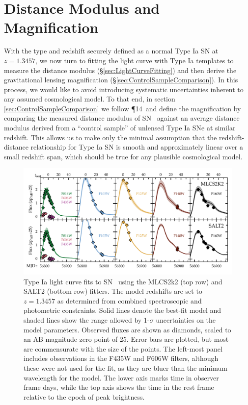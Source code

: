 \section{Distance Modulus and Magnification}
\label{sec:DistanceAndMagnification}

With the type and redshift securely defined as a normal Type Ia SN at
$z=1.3457$, we now turn to fitting the light curve with Type Ia
templates to measure the distance
modulus (\S\ref{sec:LightCurveFitting}) and then derive the
gravitational lensing
magnification (\S\ref{sec:ControlSampleComparison}).  In this
process, we would like to avoid introducing systematic uncertainties
inherent to any assumed cosmological model.  To that end, in
section \ref{sec:ControlSampleComparison} we
follow \P14\ and define the magnification by comparing
the measured distance modulus of SN \tomas\ against an average
distance modulus derived from a ``control sample'' of unlensed Type Ia
SNe at similar redshift. This allows us to make only the minimal
assumption that the redshift-distance relationship for Type Ia SN is
smooth and approximately linear over a small redshift span, which
should be true for any plausible cosmological model.


\begin{figure}
\begin{center}
\includegraphics[width=\textwidth]{snTomas_lightcurve_fit_fluxAB25}
\caption{ Type Ia light curve fits to SN \tomas\ using the MLCS2k2
(top row) and SALT2 (bottom row) fitters. The model redshifts are set to
$z=1.3457$ as determined from combined
spectroscopic and photometric constraints.  Solid lines denote the
best-fit model and shaded lines show the range allowed by 1-$\sigma$
uncertainties on the model parameters. 
Observed fluxes are shown as diamonds, scaled to an AB magnitude
zero point of 25. Error bars are plotted, but most are commensurate
with the size of the points. The left-most panel includes observations
in the F435W and F606W filters, although these were not used for the
fit, as they are bluer than the minimum wavelength for the model. The
lower axis marks time in observer frame days, while the top axis shows
the time in the rest frame relative to the epoch of peak brightness.
\label{fig:LightCurveFits} }
\end{center}
\end{figure}


